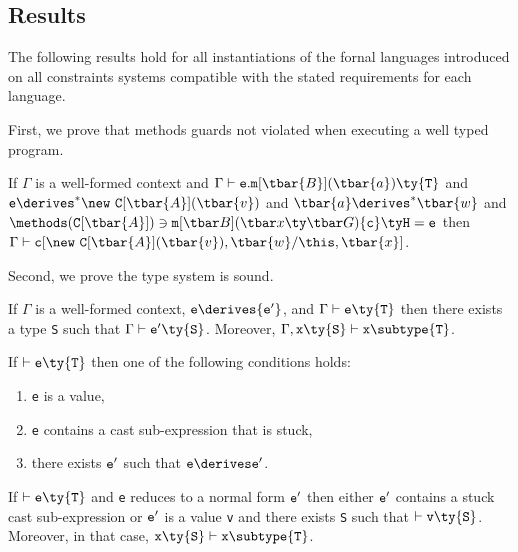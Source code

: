\subsection{Results}
The following results hold for all instantiations of the fornal languages introduced on all constraints systems compatible with the stated requirements for each language.

First, we prove that methods guards not violated when executing a well typed program.
\begin{theorem} If $\Gamma$ is a well-formed context and $\Gamma \vdash {\tt e}.{\tt m}[\tbar{B}](\tbar{a})\ty{\tt T}$ and ${\tt e} \derives^*	 \new~{\tt C}[\tbar{A}](\tbar{v})$ and $\tbar{a} \derives^* \tbar{w}$ and $\methods({\tt C}[\tbar{A}])\ni\minst{B}{x}{G}{c}{H}{e}$ then $\Gamma\vdash {\tt c}[\new~{\tt C}[\tbar{A}](\tbar{v}),\tbar{w}/\this,\tbar{x}]$.
\end{theorem}

Second, we prove the type system is sound.

\begin{lemma} If $\Gamma$ is a well-formed context, ${\tt e} \derives {\tt e'}$, and $\Gamma \vdash {\tt e}\ty{\tt T}$ then there exists a type {\tt S} such that $\Gamma\vdash{\tt e'}\ty{\tt S}$. Moreover, $\Gamma,{\tt x}\ty{\tt S} \vdash {\tt x}\subtype{\tt T}$.
\end{lemma}

\begin{lemma}[Progress]
If $\vdash {\tt e}\ty{\tt T}$ then one of the following conditions holds:
\begin{enumerate}
\item {\tt e} is a value,
\item {\tt e} contains a cast sub-expression that is stuck,
\item there exists $\tt e'$ such that $\tt e\derives e'$.
\end{enumerate}
\end{lemma}

\begin{theorem}
If $\vdash {\tt e}\ty{\tt T}$ and {\tt e}
reduces to a normal form ${\tt e'}$ then either ${\tt e'}$ contains a stuck cast sub-expression or ${\tt e'}$ is a value {\tt v} and there exists {\tt S} such that $\vdash {\tt v}\ty{\tt S}$. Moreover, in that case, ${\tt x}\ty{\tt S}\vdash{\tt x}\subtype{\tt T}$.
\end{theorem}












